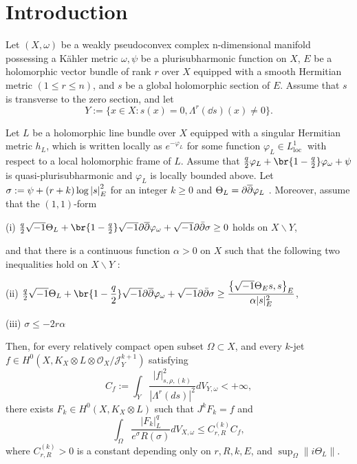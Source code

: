 \documentclass[lang=cn,12pt,a4paper,fontset=none]{beautybook}
\begin{document}
\section{Introduction}
\begin{theorem}
   Let $(X, \omega)$ be a weakly pseudoconvex complex n-dimensional manifold possessing a Kähler metric $\omega, \psi$ be a plurisubharmonic function on $X$, $E$ be a holomorphic vector bundle of rank $r$ over $X$ equipped with a smooth Hermitian metric $(1 \leq r\leq n)$, and $s$ be a global holomorphic section of $E$. Assume that $s$ is transverse to the zero section, and let
$$
Y:=\{x \in X: s(x)=0, \Lambda^r (\dd s)(x)\neq 0\} .
$$

Let $L$ be a holomorphic line bundle over $X$ equipped with a singular Hermitian metric $h_L$, which is written locally as $e^{-\varphi_L}$ for some function $\varphi_L \in L_{\text {loc }}^1$ with respect to a local holomorphic frame of $L$. Assume that $\frac{q}{2}\varphi_L+\br{1-\frac{q}{2}}\varphi_\omega+\psi$ is quasi-plurisubharmonic and $\varphi_L$ is locally bounded above. Let $\sigma:=\psi+(r+k)\log \abs{s}^2_E$  for an integer $k\geqslant 0$  and $\Theta_L=\partial\overline{\partial}\varphi_L$ .  Moreover, assume that the $(1,1)$-form  

(i) $\frac{q}{2}\sqrt{-1} \Theta_L+\br{1-\frac{q}{2}}\sqrt{-1}\bd\bdd\varphi_\omega+ \sqrt{-1} \partial \bar{\partial} \sigma \geq 0$ holds on $X \backslash Y$, 

and that there is a continuous function $\alpha>0$ on $X$ such that the following two inequalities hold on $X \backslash Y$ :

(ii) $\frac{q}{2}\displaystyle\sqrt{-1} \Theta_L+\br{1-\frac{q}{2}}\sqrt{-1}\bd\bdd\varphi_\omega+\sqrt{-1} \partial \bar{\partial} \sigma \geq \frac{\left\{\sqrt{-1} \Theta_E s, s\right\}_E}{\alpha|s|_E^2}$,

(iii) $\sigma\leq-2 r \alpha$

Then, for every relatively compact open subset $\Omega \subset X$, and every $k$-jet $f \in H^0\left(X, K_X\otimes L \otimes \mathcal{O}_X / \mathcal{J}_Y^{k+1}\right)$ satisfying
$$
C_f :=\int_Y \frac{|f|_{s, \rho,(k)}^2}{\left|\Lambda^r(d s)\right|^{2} }d V_{Y, \omega}<+\infty,
$$
there exists $F_k \in H^0\left(X, K_X \otimes L\right)$ such that $J^k F_k=f$ and
$$
\int_{\Omega} \frac{\left|F_k\right|_L^q}{e^\sigma R(\sigma)} d V_{X, \omega} \leq C_{r,R}^{(k)} C_f,
$$
where $C_{r,R}^{(k)}>0$ is a constant depending only on $r, R,k, E$, and $\sup _{\Omega}\|i \Theta_L\|$.

\end{theorem}
\end{document}
